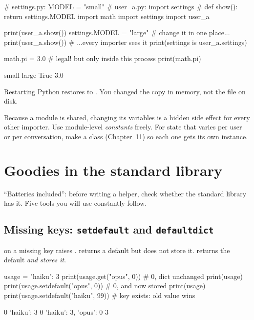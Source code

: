 \begin{pycode}
# settings.py:   MODEL = "small"
# user_a.py:     import settings
#                def show(): return settings.MODEL
import math
import settings
import user_a

print(user_a.show())
settings.MODEL = "large"        # change it in one place...
print(user_a.show())            # ...every importer sees it
print(settings is user_a.settings)

math.pi = 3.0                   # legal! but only inside this process
print(math.pi)
\end{pycode}
\begin{rawcode}
small
large
True
3.0
\end{rawcode}

Restarting Python restores  to . You changed the
copy in memory, not the file on disk.

\begin{trap}
Because a module is shared, changing its variables is a hidden side effect for every
other importer. Use module-level \emph{constants} freely. For state that varies per user or
per conversation, make a class (Chapter~11) so each one gets its own instance.
\end{trap}

\section{Goodies in the standard library}

``Batteries included'': before writing a helper, check whether the standard library has it.
Five tools you will use constantly follow.

\subsection{Missing keys: \texttt{setdefault} and \texttt{defaultdict}}

 on a missing key raises .  returns a default
but does not store it.  returns the default \emph{and stores it}.

\begin{pycode}
usage = {"haiku": 3}
print(usage.get("opus", 0))           # 0, dict unchanged
print(usage)
print(usage.setdefault("opus", 0))    # 0, and now stored
print(usage)
print(usage.setdefault("haiku", 99))  # key exists: old value wins
\end{pycode}
\begin{rawcode}
0
{'haiku': 3}
0
{'haiku': 3, 'opus': 0}
3
\end{rawcode}

